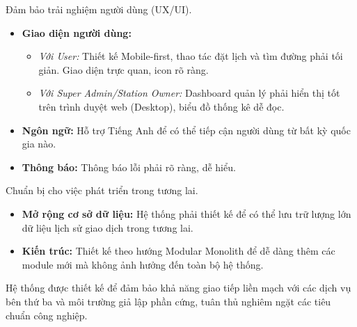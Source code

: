Đảm bảo trải nghiệm người dùng (UX/UI).
\begin{itemize}
    \item \textbf{Giao diện người dùng:}
    \begin{itemize}
        \item \textit{Với User:} Thiết kế Mobile-first, thao tác đặt lịch và tìm đường phải tối giản. Giao diện trực quan, icon rõ ràng.
        \item \textit{Với Super Admin/Station Owner:} Dashboard quản lý phải hiển thị tốt trên trình duyệt web (Desktop), biểu đồ thống kê dễ đọc.
    \end{itemize}
    \item \textbf{Ngôn ngữ:} Hỗ trợ Tiếng Anh để có thể tiếp cận người dùng từ bất kỳ quốc gia nào.
    \item \textbf{Thông báo:} Thông báo lỗi phải rõ ràng, dễ hiểu.
\end{itemize}


Chuẩn bị cho việc phát triển trong tương lai.
\begin{itemize}
    \item \textbf{Mở rộng cơ sở dữ liệu:} Hệ thống phải thiết kế để có thể lưu trữ lượng lớn dữ liệu lịch sử giao dịch trong tương lai.
    \item \textbf{Kiến trúc:} Thiết kế theo hướng Modular Monolith để dễ dàng thêm các module mới mà không ảnh hưởng đến toàn bộ hệ thống.
\end{itemize}


Hệ thống được thiết kế để đảm bảo khả năng giao tiếp liền mạch với các dịch vụ bên thứ ba và môi trường giả lập phần cứng, tuân thủ nghiêm ngặt các tiêu chuẩn công nghiệp.

